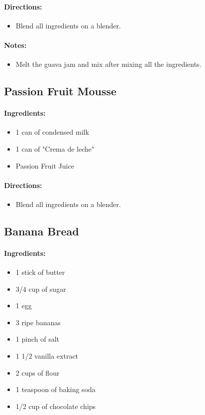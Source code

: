 \documentclass{article}
\begin{document}
\paragraph{Directions:}
\begin{itemize}
    \item Blend all ingredients on a blender.
\end{itemize}

\paragraph{Notes:}
\begin{itemize}
    \item Melt the guava jam and mix after mixing all the ingredients.
\end{itemize}

\subsection{Passion Fruit Mousse}

\paragraph{Ingredients:}
\begin{itemize}
    \item 1 can of condensed milk
    \item 1 can of "Crema de leche"
    \item Passion Fruit Juice
\end{itemize}

\paragraph{Directions:}
\begin{itemize}
    \item Blend all ingredients on a blender.
\end{itemize}

\subsection{Banana Bread}

\paragraph{Ingredients:}
\begin{itemize}
    \item 1 stick of butter
    \item 3/4 cup of sugar
    \item 1 egg
    \item 3 ripe bananas
    \item 1 pinch of salt
    \item 1 1/2 vanilla extract
    \item 2 cups of flour
    \item 1 teaspoon of baking soda
    \item 1/2 cup of chocolate chips
\end{itemize}
\end{document}
